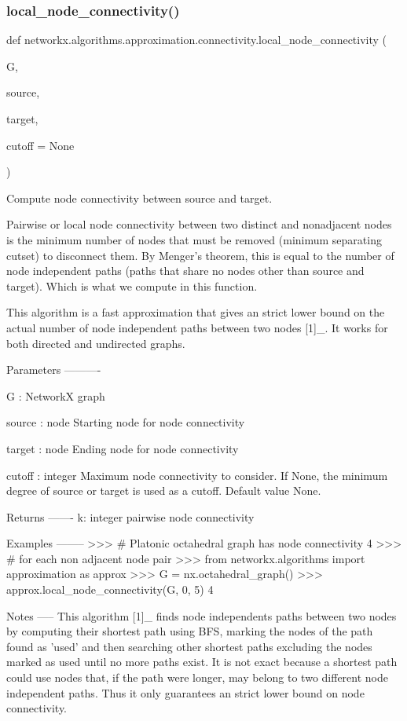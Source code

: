 \subsubsection{\texorpdfstring{local\+\_\+node\+\_\+connectivity()}{local\_node\_connectivity()}}
{\footnotesize\ttfamily def networkx.\+algorithms.\+approximation.\+connectivity.\+local\+\_\+node\+\_\+connectivity (\begin{DoxyParamCaption}\item[{}]{G,  }\item[{}]{source,  }\item[{}]{target,  }\item[{}]{cutoff = {\ttfamily None} }\end{DoxyParamCaption})}

\begin{DoxyVerb}Compute node connectivity between source and target.

Pairwise or local node connectivity between two distinct and nonadjacent
nodes is the minimum number of nodes that must be removed (minimum
separating cutset) to disconnect them. By Menger's theorem, this is equal
to the number of node independent paths (paths that share no nodes other
than source and target). Which is what we compute in this function.

This algorithm is a fast approximation that gives an strict lower
bound on the actual number of node independent paths between two nodes [1]_.
It works for both directed and undirected graphs.

Parameters
----------

G : NetworkX graph

source : node
    Starting node for node connectivity

target : node
    Ending node for node connectivity

cutoff : integer
    Maximum node connectivity to consider. If None, the minimum degree
    of source or target is used as a cutoff. Default value None.

Returns
-------
k: integer
   pairwise node connectivity

Examples
--------
>>> # Platonic octahedral graph has node connectivity 4
>>> # for each non adjacent node pair
>>> from networkx.algorithms import approximation as approx
>>> G = nx.octahedral_graph()
>>> approx.local_node_connectivity(G, 0, 5)
4

Notes
-----
This algorithm [1]_ finds node independents paths between two nodes by
computing their shortest path using BFS, marking the nodes of the path
found as 'used' and then searching other shortest paths excluding the
nodes marked as used until no more paths exist. It is not exact because
a shortest path could use nodes that, if the path were longer, may belong
to two different node independent paths. Thus it only guarantees an
strict lower bound on node connectivity.


\end{DoxyVerb}
